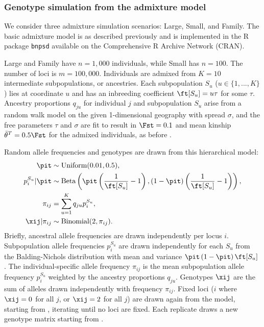 \documentclass[11pt]{article}
\begin{document}
\subsubsection{Genotype simulation from the admixture model}

We consider three admixture simulation scenarios: Large, Small, and Family.
The basic admixture model is as described previously \citep{ochoa_fst1, ochoa_estimating_2021} and is implemented in the R package \texttt{bnpsd} available on the Comprehensive R Archive Network (CRAN).

Large and Family have $n = 1,000$ individuals, while Small has $n = 100$.
The number of loci is $m = 100,000$.
Individuals are admixed from $K = 10$ intermediate subpopulations, or ancestries.
Each subpopulation $S_u$ ($u \in \{ 1, ..., K \}$) lies at coordinate $u$ and has an inbreeding coefficient $\ft[S_u] = u \tau$ for some $\tau$.
Ancestry proportions $q_{ju}$ for individual $j$ and subpopulation $S_u$ arise from a random walk model on the given 1-dimensional geography with spread $\sigma$, and the free parameters $\tau$ and $\sigma$ are fit to result in $\Fst = 0.1$ and mean kinship $\bar{\theta}^T = 0.5 \Fst$ for the admixed individuals, as before \citep{ochoa_estimating_2021}.

Random allele frequencies and genotypes are drawn from this hierarchical model:
\begin{align*}
  \pit
  &\sim
    \text{Uniform}( 0.01, 0.5 )
    , \\
  p_i^{S_u} | \pit
  &\sim
    \text{Beta} \left(
    \pit \left( \frac{1}{ \ft[S_u] } - 1 \right),
    \left( 1 - \pit \right) \left( \frac{1}{ \ft[S_u] } - 1 \right)
    \right)
    , \\
  \pi_{ij}
  &=
    \sum_{u = 1}^K q_{ju} p_i^{S_u}
    , \\
  \xij | \pi_{ij}
  &\sim
    \text{Binomial}(2, \pi_{ij})
    .
\end{align*}
Briefly, ancestral allele frequencies \pit are drawn independently per locus $i$.
Subpopulation allele frequencies $p_i^{S_u}$ are drawn independently for each $S_u$ from the Balding-Nichols distribution with mean \pit and variance $\pit \left( 1 - \pit \right) \ft[S_u]$ \citep{balding_method_1995}.
The individual-specific allele frequency $\pi_{ij}$ is the mean subpopulation allele frequency $p_i^{S_u}$ weighted by the ancestry proportions $q_{ju}$.
Genotypes $\xij$ are the sum of alleles drawn independently with frequency $\pi_{ij}$.
Fixed loci ($i$ where $\xij = 0$ for all $j$, or $\xij = 2$ for all $j$) are drawn again from the model, starting from \pit, iterating until no loci are fixed.
Each replicate draws a new genotype matrix starting from \pit.
\end{document}
